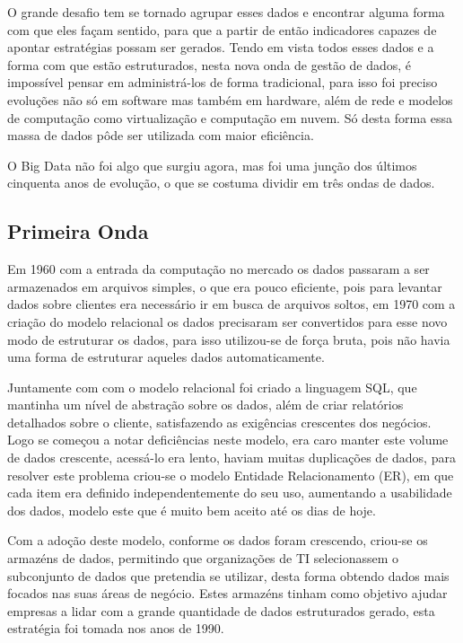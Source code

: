 O grande desafio tem se tornado agrupar esses dados e encontrar alguma forma com que eles façam sentido, para que a partir de então indicadores capazes de apontar estratégias possam ser gerados. Tendo em vista todos esses dados e a forma com que estão estruturados, nesta nova onda de gestão de dados, é impossível pensar em administrá-los de forma tradicional, para isso foi preciso evoluções não só em software mas também em hardware, além de rede e modelos de computação como virtualização e computação em nuvem. Só desta forma essa massa de dados pôde ser utilizada com maior eficiência.~\cite{leigos}

O Big Data não foi algo que surgiu agora, mas foi uma junção dos últimos cinquenta anos de evolução, o que se costuma dividir em três ondas de dados.

\subsection{Primeira Onda}
\label{subsec:primeiraonda}
Em 1960 com a entrada da computação no mercado os dados passaram a ser armazenados em arquivos simples, o que era pouco eficiente, pois para levantar dados sobre clientes era necessário ir em busca de arquivos soltos, em 1970 com a criação do modelo relacional os dados precisaram ser convertidos para esse novo modo de estruturar os dados, para isso utilizou-se de força bruta, pois não havia uma forma de estruturar aqueles dados automaticamente.~\cite{leigos}

Juntamente com com o modelo relacional foi criado a linguagem SQL, que mantinha um nível de abstração sobre os dados, além de criar relatórios detalhados sobre o cliente, satisfazendo as exigências crescentes dos negócios. Logo se começou a notar deficiências neste modelo, era caro manter este volume de dados crescente, acessá-lo era lento, haviam muitas duplicações de dados, para resolver este problema criou-se o modelo Entidade Relacionamento (ER), em que cada item era definido independentemente do seu uso, aumentando a usabilidade dos dados, modelo este que é muito bem aceito até os dias de hoje.~\cite{leigos}

Com a adoção deste modelo, conforme os dados foram crescendo, criou-se os armazéns de dados, permitindo que organizações de TI selecionassem o subconjunto de dados que pretendia se utilizar, desta forma obtendo dados mais focados nas suas áreas de negócio. Estes armazéns tinham como objetivo ajudar empresas a lidar com a grande quantidade de dados estruturados gerado, esta estratégia foi tomada nos anos de 1990.~\cite{leigos}

